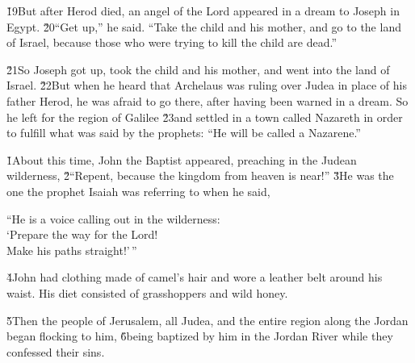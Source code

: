 \v{19}But after Herod died, an angel of the Lord appeared in a dream to Joseph in Egypt. \v{20}``Get up,'' he said. ``Take the child and his mother, and go to the land of Israel, because those who were trying to kill the child are dead.''

\v{21}So Joseph got up, took the child and his mother, and went into the land of Israel. \v{22}But when he heard that Archelaus was ruling over Judea in place of his father Herod, he was afraid to go there, after having been warned in a dream. So he left for the region of Galilee \v{23}and settled in a town called Nazareth in order to fulfill what was said by the prophets: ``He will be called a Nazarene.''

\v{1}About this time, John the Baptist appeared, preaching in the Judean wilderness, \v{2}``Repent, because the kingdom from heaven is near!'' \v{3}He was the one the prophet Isaiah was referring to when he said,

\begin{poetry}
\poeml ``He is a voice calling out in the wilderness: \\
\poemll    `Prepare the way for the Lord! \\
\poemlll       Make his paths straight!'\,''
\end{poetry}

\v{4}John had clothing made of camel's hair and wore a leather belt around his waist. His diet consisted of grasshoppers and wild honey.

\v{5}Then the people of Jerusalem, all Judea, and the entire region along the Jordan began flocking to him, \v{6}being baptized by him in the Jordan River while they confessed their sins.

